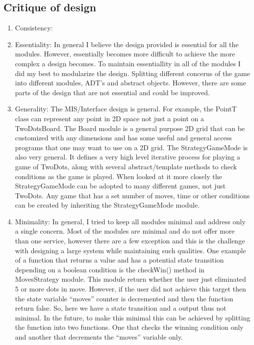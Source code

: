 \documentclass[12pt]{article}
\begin{document}
\subsection*{Critique of design}
\begin{enumerate}
\item Consistency: 

\item Essentiality: In general I believe the design provided is essential for all the modules. However, essentially becomes more difficult to achieve the more complex a design becomes. To maintain essentiallity in all of the modules I did my best to modularize the design. Splitting different concerns of the game into different modules, ADT's and abstract objects. However, there are some parts of the design that are not essential and could be improved. 

\item Generality: The MIS/Interface design is general. For example, the PointT class can represent any point in 2D space not just a point on a TwoDotsBoard. The Board module is a general purpose 2D grid that can be customized with any dimensions and has some useful and general access programs that one may want to use on a 2D grid. The StrategyGameMode is also very general. It defines a very high level iterative process for playing a game of TwoDots, along with several abstract/template methods to check conditions as the game is played. When looked at it more closely the StrategyGameMode can be adopted to many different games, not just TwoDots. Any game that has a set number of moves, time or other conditions can be created by inheriting the StrategyGameMode module. 

\item Minimality: In general, I tried to keep all modules minimal and address only a single concern. Most of the modules are minimal and do not offer more than one service, however there are a few exception and this is the challenge with designing a large system while maintaining such qualities. One example of a function that returns a value and has a potential state transition depending on a boolean condition is the checkWin() method in MovesStrategy module. This module return whether the user just eliminated 5 or more dots in move. However, if the user did not achieve this target then the state variable ``moves'' counter is decremented and then the function return false. So, here we have a state transition and a output thus not minimal. In the future, to make this minimal this can be achieved by splitting the function into two functions. One that checks the winning condition only and another that decrements the ``moves'' variable only.


\end{enumerate}
\end{document}

